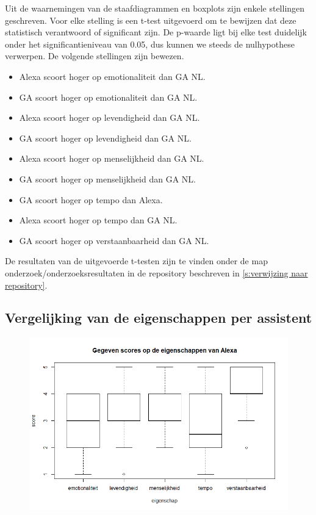 Uit de waarnemingen van de staafdiagrammen en boxplots zijn enkele stellingen geschreven. Voor elke stelling is een t-test uitgevoerd om te bewijzen dat deze statistisch verantwoord of significant zijn. De p-waarde ligt bij elke test duidelijk onder het significantieniveau van 0.05, dus kunnen we steeds de nulhypothese verwerpen. De volgende stellingen zijn bewezen.
\begin{itemize}
    \item Alexa scoort hoger op emotionaliteit dan GA NL.
    \item GA scoort hoger op emotionaliteit dan GA NL.
    \item Alexa scoort hoger op levendigheid dan GA NL.
    \item GA scoort hoger op levendigheid dan GA NL.
    \item Alexa scoort hoger op menselijkheid dan GA NL.
    \item GA scoort hoger op menselijkheid dan GA NL.
    \item GA scoort hoger op tempo dan Alexa.
    \item Alexa scoort hoger op tempo dan GA NL.
    \item GA scoort hoger op verstaanbaarheid dan GA NL.
\end{itemize}

De resultaten van de uitgevoerde t-testen zijn te vinden onder de map onderzoek/onderzoeksresultaten in de repository beschreven in \ref{s:verwijzing naar repository}.

\subsection{Vergelijking van de eigenschappen per assistent}
\begin{figure}[h]
    \includegraphics[width=0.9\linewidth]{../onderzoek/onderzoeksresultaten/vergelijking_eigenschappen_per_assistent/boxplot_score_eigenschappen_alexa}
    \caption{}
    \label{fig:boxplot-alexa}
\end{figure}

